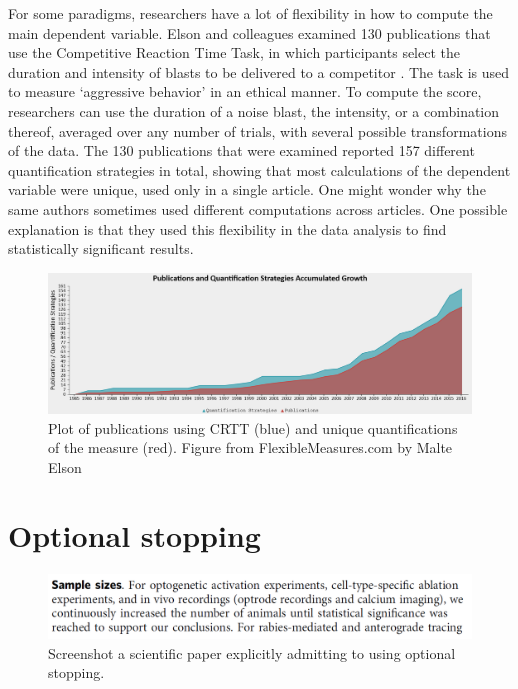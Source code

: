 \documentclass[
  oneside]{krantz}
\begin{document}
For some paradigms, researchers have a lot of flexibility in how to compute the main dependent variable. Elson and colleagues examined 130 publications that use the Competitive Reaction Time Task, in which participants select the duration and intensity of blasts to be delivered to a competitor \citep{elson_press_2014}. The task is used to measure `aggressive behavior' in an ethical manner. To compute the score, researchers can use the duration of a noise blast, the intensity, or a combination thereof, averaged over any number of trials, with several possible transformations of the data. The 130 publications that were examined reported 157 different quantification strategies in total, showing that most calculations of the dependent variable were unique, used only in a single article. One might wonder why the same authors sometimes used different computations across articles. One possible explanation is that they used this flexibility in the data analysis to find statistically significant results.



\begin{figure}

{\centering \includegraphics[width=1\linewidth]{images/flexiblemeasure} 

}

\caption{Plot of publications using CRTT (blue) and unique quantifications of the measure (red). Figure from FlexibleMeasures.com by Malte Elson}\label{fig:flexiblemeasure}
\end{figure}

\hypertarget{optionalstopping}{%
\section{Optional stopping}\label{optionalstopping}}



\begin{figure}

{\centering \includegraphics[width=1\linewidth]{images/optionalstoppingexample} 

}

\caption{Screenshot a scientific paper explicitly admitting to using optional stopping.}\label{fig:optionalstoppingexample}
\end{figure}
\end{document}
